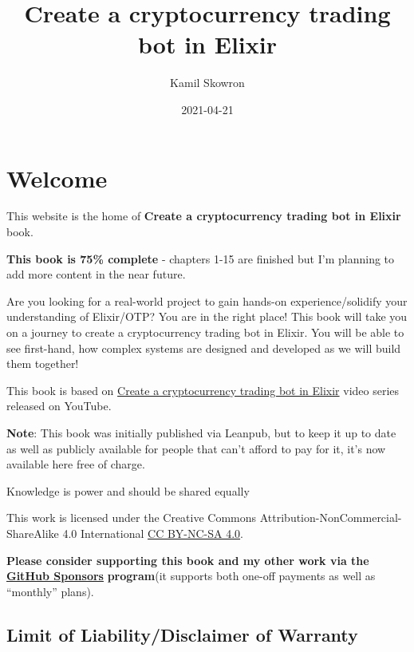 \documentclass[
]{book}
\title{Create a cryptocurrency trading bot in Elixir}
\author{Kamil Skowron}
\date{2021-04-21}
\begin{document}
\maketitle

{
\setcounter{tocdepth}{1}
\tableofcontents
}
\hypertarget{welcome}{%
\chapter*{Welcome 👋}\label{welcome}}

This website is the home of \textbf{Create a cryptocurrency trading bot in Elixir} book.

\textbf{This book is 75\% complete} - chapters 1-15 are finished but I'm planning to add more content in the near future.

Are you looking for a real-world project to gain hands-on experience/solidify your understanding of Elixir/OTP? You are in the right place! This book will take you on a journey to create a cryptocurrency trading bot in Elixir. You will be able to see first-hand, how complex systems are designed and developed as we will build them together!

This book is based on \href{https://www.youtube.com/watch?v=wVYIx7M6o28\&list=PLxsE19GnjC5Nv1CbeKOiS5YqGqw35aZFJ}{Create a cryptocurrency trading bot in Elixir} video series released on YouTube.

\textbf{Note}: This book was initially published via Leanpub, but to keep it up to date as well as publicly available for people that can't afford to pay for it, it's now available here free of charge.

Knowledge is power and should be shared equally 🙏

This work is licensed under the Creative Commons Attribution-NonCommercial-ShareAlike 4.0 International \href{https://creativecommons.org/licenses/by-nc-sa/4.0/}{CC BY-NC-SA 4.0}.

\textbf{Please consider supporting this book and my other work via the }\href{https://github.com/sponsors/frathon}{\textbf{GitHub Sponsors}} \textbf{program}(it supports both one-off payments as well as ``monthly'' plans).

\hypertarget{limit-of-liabilitydisclaimer-of-warranty}{%
\section*{Limit of Liability/Disclaimer of Warranty}\label{limit-of-liabilitydisclaimer-of-warranty}}
\end{document}
